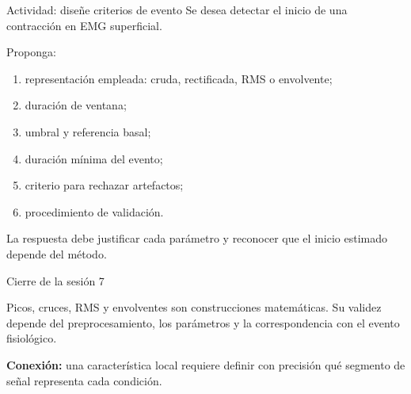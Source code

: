 \documentclass[
  ignorenonframetext,
  aspectratio=169,
  spanish,
  professionalfonts]{beamer}
\providecommand{\tightlist}{%
  \setlength{\itemsep}{0pt}\setlength{\parskip}{0pt}}
\begin{document}
\begin{frame}{Actividad: diseñe criterios de evento}
\protect{}\label{actividad-diseuxf1e-criterios-de-evento}
Se desea detectar el inicio de una contracción en EMG superficial.

Proponga:

\begin{enumerate}
\tightlist
\item
  representación empleada: cruda, rectificada, RMS o envolvente;
\item
  duración de ventana;
\item
  umbral y referencia basal;
\item
  duración mínima del evento;
\item
  criterio para rechazar artefactos;
\item
  procedimiento de validación.
\end{enumerate}

\begin{tcolorbox}[enhanced jigsaw, arc=.35mm, bottomrule=.15mm, bottomtitle=1mm, breakable, colback=white, colbacktitle=quarto-callout-tip-color!10!white, colframe=quarto-callout-tip-color-frame, coltitle=black, left=2mm, leftrule=.75mm, opacityback=0, opacitybacktitle=0.6, rightrule=.15mm, title={Criterio de evaluación}, titlerule=0mm, toprule=.15mm, toptitle=1mm]

La respuesta debe justificar cada parámetro y reconocer que el inicio
estimado depende del método.

\end{tcolorbox}
\end{frame}

\begin{frame}{Cierre de la sesión 7}
\protect{}\label{cierre-de-la-sesiuxf3n-7}
\begin{tcolorbox}[enhanced jigsaw, arc=.35mm, bottomrule=.15mm, bottomtitle=1mm, breakable, colback=white, colbacktitle=quarto-callout-important-color!10!white, colframe=quarto-callout-important-color-frame, coltitle=black, left=2mm, leftrule=.75mm, opacityback=0, opacitybacktitle=0.6, rightrule=.15mm, title={Síntesis}, titlerule=0mm, toprule=.15mm, toptitle=1mm]

Picos, cruces, RMS y envolventes son construcciones matemáticas. Su
validez depende del preprocesamiento, los parámetros y la
correspondencia con el evento fisiológico.

\end{tcolorbox}

\textbf{Conexión:} una característica local requiere definir con
precisión qué segmento de señal representa cada condición.
\end{frame}
\end{document}
